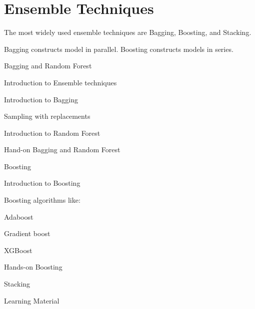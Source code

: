 	\chapter{Ensemble Techniques}
The most widely used ensemble techniques are Bagging, Boosting, and Stacking.

Bagging constructs model in parallel.  Boosting constructs models in series.

	\begin{bulletedlist}
		\item Bagging and Random Forest
		\begin{bulletedlist}
			\item Introduction to Ensemble techniques
			\item Introduction to Bagging
			\item Sampling with replacements
			\item Introduction to Random Forest
			\item Hand-on Bagging and Random Forest
		\end{bulletedlist}
		\item Boosting
		\begin{bulletedlist}
			\item Introduction to Boosting
			\item Boosting algorithms like:
			\item Adaboost
			\item Gradient boost
			\item XGBoost
			\item Hands-on Boosting
			\item Stacking
			\item Learning Material
		\end{bulletedlist}
	\end{bulletedlist}







